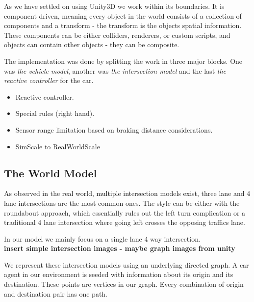 As we have settled on using Unity3D we work within its boundaries.
It is component driven, meaning every object in the world consists of a collection of components and a transform - the transform is the objects spatial information.
These components can be either colliders, renderers, or custom scripts, and objects can contain other objects - they can be composite.

The implementation was done by splitting the work in three major blocks. One was \textit{the vehicle model}, another was \textit{the intersection model} and the last \textit{the reactive controller} for the car.

\begin{itemize}
\item Reactive controller.
\item Special rules (right hand).
\item Sensor range limitation based on braking distance considerations.
\item SimScale to RealWorldScale
\end{itemize}

\subsection{The World Model}
As observed in the real world, multiple intersection models exist, three lane and 4 lane intersections are the most common ones.
The style can be either with the roundabout approach, which essentially rules out the left turn complication or a traditional 4 lane intersection where going left crosses the opposing traffics lane.

In our model we mainly focus on a single lane 4 way intersection.\\
\textbf{insert simple intersection images - maybe graph images from unity}

We represent these intersection models using an underlying directed graph.
 A car agent in our environment is seeded with information about its origin and its destination.
These points are vertices in our graph. 
Every combination of origin and destination pair has one path.

